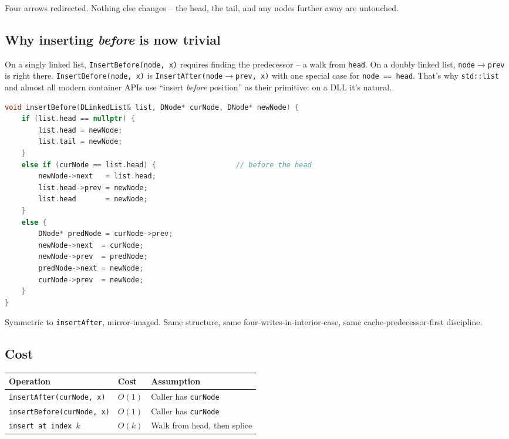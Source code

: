 \documentclass[11pt]{article}
\begin{document}
Four arrows redirected. Nothing else changes -- the head, the tail,
and any nodes further away are untouched.

\subsection{Why inserting \emph{before} is now trivial}

\begin{ideabox}
On a singly linked list, \texttt{InsertBefore(node, x)} requires
finding the predecessor -- a walk from \texttt{head}. On a doubly
linked list, \texttt{node$\to$prev} is right there.
\texttt{InsertBefore(node, x)} is \texttt{InsertAfter(node$\to$prev, x)}
with one special case for \texttt{node == head}. That's why
\texttt{std::list} and almost all modern container APIs use
``insert \emph{before} position'' as their primitive: on a DLL
it's natural.
\end{ideabox}

\begin{examplebox}
\begin{lstlisting}[basicstyle=\ttfamily\small,frame=single,language=C++]
void insertBefore(DLinkedList& list, DNode* curNode, DNode* newNode) {
    if (list.head == nullptr) {
        list.head = newNode;
        list.tail = newNode;
    }
    else if (curNode == list.head) {                   // before the head
        newNode->next   = list.head;
        list.head->prev = newNode;
        list.head       = newNode;
    }
    else {
        DNode* predNode = curNode->prev;
        newNode->next  = curNode;
        newNode->prev  = predNode;
        predNode->next = newNode;
        curNode->prev  = newNode;
    }
}
\end{lstlisting}
Symmetric to \texttt{insertAfter}, mirror-imaged. Same structure,
same four-writes-in-interior-case, same cache-predecessor-first
discipline.
\end{examplebox}

\subsection{Cost}

\begin{center}
\footnotesize
\renewcommand{\arraystretch}{1.3}
\begin{tabular}{@{}lll@{}}
\hline
\textbf{Operation}                   & \textbf{Cost} & \textbf{Assumption} \\
\hline
\texttt{insertAfter(curNode, x)}     & $O(1)$        & Caller has \texttt{curNode} \\
\texttt{insertBefore(curNode, x)}    & $O(1)$        & Caller has \texttt{curNode} \\
\texttt{insert at index $k$}          & $O(k)$        & Walk from head, then splice \\
\hline
\end{tabular}
\end{center}
\end{document}
